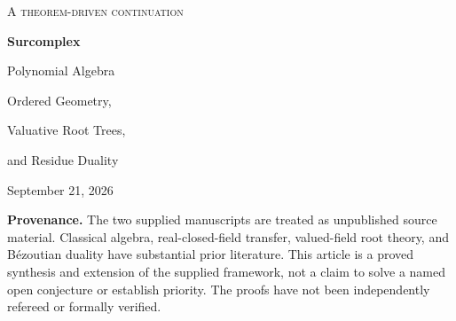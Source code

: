 \documentclass[11pt,letterpaper,oneside]{article}
\numberwithin{equation}{section}
\theoremstyle{definition}
\theoremstyle{remark}\newtheorem{remark}[theorem]{Remark}
\newcommand{\No}{\mathbf{No}}\newcommand{\SC}{\mathbf{SC}}
\newcommand{\C}{\mathbb C}\newcommand{\R}{\mathbb R}\newcommand{\Q}{\mathbb Q}
\begin{document}
\hypersetup{pageanchor=false}
\begin{titlepage}
\centering
\vspace*{0.65in}
{\large\scshape A theorem-driven continuation\par}
\vspace{0.45in}
{\Huge\bfseries Surcomplex\par Polynomial Algebra\par}
\vspace{0.3in}
{\LARGE Ordered Geometry,\par Valuative Root Trees,\par and Residue Duality\par}
\vspace{0.4in}
{\large September 21, 2026\par}
\vspace{0.35in}
\begin{minipage}{0.94\textwidth}
\begin{abstract}
We develop finite polynomial algebra over the surcomplex class
$\SC=\No[i]$, using algebraically closed, set-sized Hahn fields to make every
factorization and quotient an ordinary set-sized construction. The theory has
three interacting structures: algebraic closedness, ordered complex geometry,
and an arbitrary-rank valuation with residue field $\C$.

We prove surcomplex forms of Gauss--Lucas, polynomial Rouch\'e, Hermite's
signature criterion, Newton-polygon root counting, coprime Hensel lifting,
and exact Rolle counts in valuative disks. A residual derivative polynomial
locates the critical points between the children of each root cluster.
Discriminants become weighted sums on the cluster tree, and an explicit
coefficient-precision theorem preserves all pairwise root separations while
giving the leading displacement of each root.

For polynomial systems with coordinate-power highest terms, we construct a
global finite-free quotient over any commutative coefficient ring, including
Hahn-coherent parameter rings. A total-degree argument replaces the
positive-support hypothesis needed in the supplied analytic manuscripts.
An explicit multivariate B\'ezoutian is the duality kernel; on its diagonal it
is the Jacobian, giving an exact trace--residue formula through collisions.
For positive lower-degree perturbations this also identifies the polynomial
restriction of the contour residue in the supplied research manuscript.
All major assertions are proved, with examples and executable exact checks.
\end{abstract}
\end{minipage}
\vfill
\begin{minipage}{0.94\textwidth}\small
\textbf{Provenance.} The two supplied manuscripts are treated as unpublished
source material. Classical algebra, real-closed-field transfer, valued-field
root theory, and B\'ezoutian duality have substantial prior literature. This
article is a proved synthesis and extension of the supplied framework, not a
claim to solve a named open conjecture or establish priority. The proofs have
not been independently refereed or formally verified.
\end{minipage}
\end{titlepage}
\end{document}
